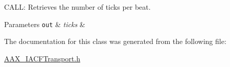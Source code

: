 C\+A\+L\+L\+: Retrieves the number of ticks per beat. 


\begin{DoxyParams}[1]{Parameters}
\mbox{\tt out}  & {\em ticks} & \\
\hline
\end{DoxyParams}


The documentation for this class was generated from the following file\+:\begin{DoxyCompactItemize}
\item 
\hyperlink{a00233}{A\+A\+X\+\_\+\+I\+A\+C\+F\+Transport.\+h}\end{DoxyCompactItemize}
